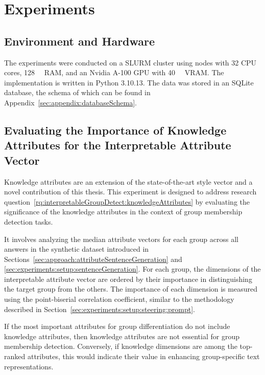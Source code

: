 \chapter{Experiments}
\label{sec:experiments}

\section{Environment and Hardware}
\label{sec:experiments:environmentHardware}
The experiments were conducted on a SLURM cluster using nodes with \num{32} CPU cores, \SI{128}{\giga\byte} RAM, and an Nvidia A-100 GPU with \SI{40}{\giga\byte} VRAM. The implementation is written in Python 3.10.13. The data was stored in an SQLite database, the schema of which can be found in Appendix~\ref{sec:appendix:databaseSchema}.





\section{Evaluating the Importance of Knowledge Attributes for the Interpretable Attribute Vector}%
\label{sec:experiments:knowledgeAttributes}
Knowledge attributes are an extension of the state-of-the-art style vector and a novel contribution of this thesis. This experiment is designed to address research question~\ref{rq:interpretableGroupDetect:knowledgeAttributes} by evaluating the significance of the knowledge attributes in the context of group membership detection tasks.

It involves analyzing the median attribute vectors for each group across all answers in the synthetic dataset introduced in Sections~\ref{sec:approach:attributeSentenceGeneration} and \ref{sec:experiments:setup:sentenceGeneration}. For each group, the dimensions of the interpretable attribute vector are ordered by their importance in distinguishing the target group from the others. The importance of each dimension is measured using the point-biserial correlation coefficient, similar to the methodology described in Section~\ref{sec:experiments:setup:steering:prompt}.

If the most important attributes for group differentiation do not include knowledge attributes, then knowledge attributes are not essential for group membership detection. Conversely, if knowledge dimensions are among the top-ranked attributes, this would indicate their value in enhancing group-specific text representations.


